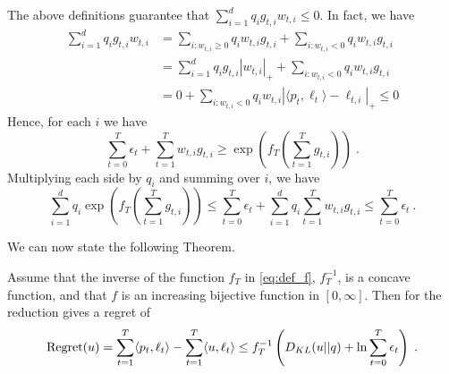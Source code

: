 The above definitions guarantee that $\sum_{i=1}^d q_i g_{t,i} w_{t,i} \le 0$. In fact, we have
\begin{align*}
\sum_{i=1}^d q_i g_{t,i} w_{t,i}
& = \sum_{i:w_{t,i}\ge 0} q_i w_{t,i} g_{t,i} + \sum_{i:w_{t,i} < 0} q_i w_{t,i} g_{t,i} \\
& = \sum_{i=1}^d q_i g_{t,i} |w_{t,i}|_+ + \sum_{i:w_{t,i} < 0} q_i w_{t,i} g_{t,i} \\
& = 0 + \sum_{i:w_{t,i} < 0} q_i w_{t,i} |\langle p_t, \ell_t\rangle - \ell_{t,i}|_+ \le 0
\end{align*}
Hence, for each $i$ we have
\[
\sum_{t=0}^T \epsilon_t + \sum_{t=1}^T w_{t,i} g_{t,i} \geq \exp\left(f_T \left( \sum_{t=1}^T g_{t,i} \right)\right) \; .
\]
Multiplying each side by $q_i$ and summing over $i$, we have
\begin{equation}
\label{eq:bounded_potential}
\sum_{i=1}^d q_i \exp\left(f_T\left(\sum_{t=1}^T g_{t,i} \right)\right) \leq \sum_{t=0}^T \epsilon_t + \sum_{i=1}^d q_i \sum_{t=1}^T w_{t,i} g_{t,i} \le \sum_{t=0}^T \epsilon_t~.
\end{equation}

We can now state the following Theorem.
\begin{theorem}
\label{theo:expert_reduction}
Assume that the inverse of the function $f_T$ in \eqref{eq:def_f}, $f_T^{-1}$, is a concave function, and that $f$ is an increasing bijective function in $[0,\infty]$.
Then for the reduction gives a regret of 
\[
\operatorname{Regret}(u) = \sum_{t=1}^T \langle p_t, \ell_t \rangle - \sum_{t=1}^T \langle u, \ell_t \rangle \leq f_T^{-1}\left(D_{KL}(u||q) + \ln \sum_{t=0}^T \epsilon_t\right) \;.
\]
\end{theorem}